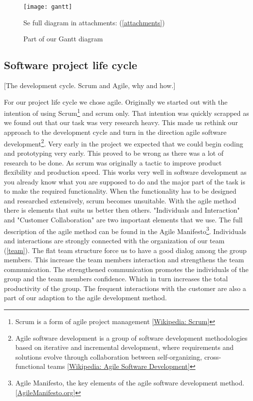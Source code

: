         \begin{figure}[h]
            \centering
            \texttt{[image: gantt]}
            \caption{Part of our Gantt diagram} Se full diagram in attachments: (\ref{attachments})
            \label{fig:gantt}
        \end{figure}
    
    \subsection{Software project life cycle} [The development cycle. Scrum and Agile, why and how.]
    
    For our project life cycle we chose agile. Originally we started out with the intention of using Scrum\footnote
        {Scrum is a form of agile project management [\href{http://en.wikipedia.org/wiki/Scrum_(development)}{Wikipedia: Scrum}]} 
        and scrum only. That intention was quickly scrapped as we found out that our task was very research heavy. This made us rethink our approach to the development cycle and turn in the direction agile software development\footnote
        {Agile software development is a group of software development methodologies based on iterative and incremental development, where requirements and solutions evolve through collaboration between self-organizing, cross-functional teams [\href{http://en.wikipedia.org/wiki/Agile_software_development.}{Wikipedia: Agile Software Development}]}.
    Very early in the project we expected that we could begin coding and prototyping very early. This proved to be wrong as there was a lot of research to be done. As scrum was originally a tactic to improve product flexibility and production speed. This works very well in software development as you already know what you are supposed to do and the major part of the task is to make the required functionality. When the functionality has to be designed and researched extensively, scrum becomes unsuitable. 
    With the agile method there is elements that suits us better then others. "Individuals and Interaction" and "Customer Collaboration" are two important elements that we use. The full description of the agile method can be found in the Agile Manifesto\footnote
        {Agile Manifesto, the key elements of the agile software development method. [\href{http://http://agilemanifesto.org/}{AgileManifesto.org}]}.
    Individuals and interactions are strongly connected with the organization of our team (\ref{team}). The flat team structure force us to have a good dialog among the group members. This increase the team members interaction and strengthens the team communication. The strengthened communication promotes the individuals of the group and the team members confidence. Which in turn increases the total productivity of the group. The frequent interactions with the customer are also a part of our adaption to the agile development method. 
